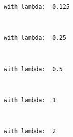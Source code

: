 \documentclass[11pt]{article}
\begin{document}
    \begin{Verbatim}[commandchars=\\\{\}]
     with lambda:  0.125

    \end{Verbatim}

    \begin{center}
    \end{center}
    { \hspace*{\fill} \\}
    
    \begin{Verbatim}[commandchars=\\\{\}]
     with lambda:  0.25

    \end{Verbatim}

    \begin{center}
    \end{center}
    { \hspace*{\fill} \\}
    
    \begin{Verbatim}[commandchars=\\\{\}]
     with lambda:  0.5

    \end{Verbatim}

    \begin{center}
    \end{center}
    { \hspace*{\fill} \\}
    
    \begin{Verbatim}[commandchars=\\\{\}]
     with lambda:  1

    \end{Verbatim}

    \begin{center}
    \end{center}
    { \hspace*{\fill} \\}
    
    \begin{Verbatim}[commandchars=\\\{\}]
     with lambda:  2

    \end{Verbatim}
\end{document}
